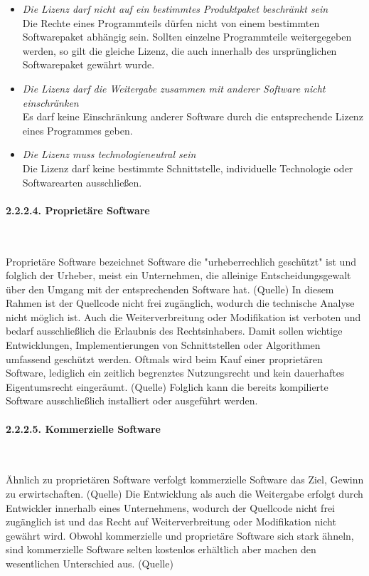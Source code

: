 \begin{itemize}
    \item \textit{Die Lizenz darf nicht auf ein bestimmtes Produktpaket beschränkt sein}\\
    Die Rechte eines Programmteils dürfen nicht von einem bestimmten Softwarepaket abhängig sein. Sollten einzelne Programmteile weitergegeben werden, so gilt die gleiche Lizenz, die auch innerhalb des ursprünglichen Softwarepaket gewährt wurde.

    \item \textit{Die Lizenz darf die Weitergabe zusammen mit anderer Software nicht einschränken}\\
    Es darf keine Einschränkung anderer Software durch die entsprechende Lizenz eines Programmes geben.

    \item \textit{Die Lizenz muss technologieneutral sein}\\
    Die Lizenz darf keine bestimmte Schnittstelle, individuelle Technologie oder Softwarearten ausschließen. 

\end{itemize}

\paragraph{2.2.2.4. Proprietäre Software}$~$

Proprietäre Software bezeichnet Software die "urheberrechlich geschützt" ist und folglich der Urheber, meist ein Unternehmen, die alleinige Entscheidungsgewalt über den Umgang mit der entsprechenden Software hat. (Quelle) In diesem Rahmen ist der Quellcode nicht frei zugänglich, wodurch die technische Analyse nicht möglich ist. Auch die Weiterverbreitung oder Modifikation ist verboten und bedarf ausschließlich die Erlaubnis des Rechtsinhabers. Damit sollen wichtige Entwicklungen, Implementierungen von Schnittstellen oder Algorithmen umfassend geschützt werden. Oftmals wird beim Kauf einer proprietären Software, lediglich ein zeitlich begrenztes Nutzungsrecht und kein dauerhaftes Eigentumsrecht eingeräumt. (Quelle) Folglich kann die bereits kompilierte Software ausschließlich installiert oder ausgeführt werden. 

\paragraph{2.2.2.5. Kommerzielle Software}$~$

Ähnlich zu proprietären Software verfolgt kommerzielle Software das Ziel, Gewinn zu erwirtschaften. (Quelle) Die Entwicklung als auch die Weitergabe erfolgt durch Entwickler innerhalb eines Unternehmens, wodurch der Quellcode nicht frei zugänglich ist und das Recht auf Weiterverbreitung oder Modifikation nicht gewährt wird. Obwohl kommerzielle und proprietäre Software sich stark ähneln, sind kommerzielle Software selten kostenlos erhältlich aber machen den wesentlichen Unterschied aus. (Quelle) 

